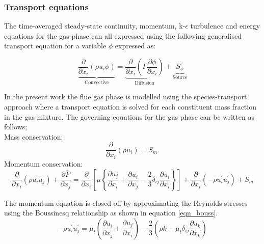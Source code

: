 \documentclass{webofc}
\begin{document}
\subsubsection{Transport equations}
The time-averaged steady-state continuity, momentum, k-$\epsilon$ turbulence  and energy equations for the gas-phase can all expressed using the following generalised transport equation for a variable $\phi$ expressed as:

\begin{equation}\label{eqn_general}
\underbrace{\frac{\partial}{\partial x_{i}}(\rho u_{i}\phi)}_{\text{Convective}}= \underbrace{\frac{\partial}{\partial x_{i}}(\Gamma\frac{\partial \phi}{\partial x_{i}})}_{\text{Diffusion}}+\underbrace{S_{\phi}}_{\text{Source}} 
\end{equation}

In the present work the flue gas phase is modelled using the species-transport approach where a transport equation is solved for each constituent mass fraction in the gas mixture. The governing equations for the gas phase can be written as follows;\\
Mass conservation:
\begin{equation}\label{eqn_RANS_mass}
\frac{\partial}{\partial x_{i}}(\rho \bar{u}_{i})=S_{m}.
\end{equation}
Momentum conservation:
\\
\begin{equation}\label{eqn_momentum}
\frac{\partial}{\partial x_{i}}(\rho u_{i}u_{j})+\frac{\partial \overline{P}}{\partial x_{j}}=\frac{\partial}{\partial x_{i}}\left[\mu\left\{\frac{\partial u_{j}}{\partial x_{i}}+\frac{\partial u_{i}}{\partial x_{j}}-\frac{2}{3}\delta_{ij}\frac{\partial u_{i}}{\partial x_{i}}\right\}\right]+\frac{\partial}{\partial x_{i}}(-\rho\overline{u_{i}^{'}u_{j}^{'}})+S_m
\end{equation}

The momentum equation is closed off by approximating the Reynolds stresses using the Boussinesq relationship as shown in equation \ref{eqn_bouss}.
\begin{equation}\label{eqn_bouss}
-\rho\overline{u_{i}^{'}u_{j}^{'}}=\mu_{t}\left(\frac{\partial u_{i}}{\partial x_{j}}+\frac{\partial u_{j}}{\partial x_{i}}\right)-\frac{2}{3}\left(\rho k+\mu_{t}\delta_{ij}\frac{\partial u_{k}}{\partial x_{k}}\right)
\end{equation}
\end{document}
